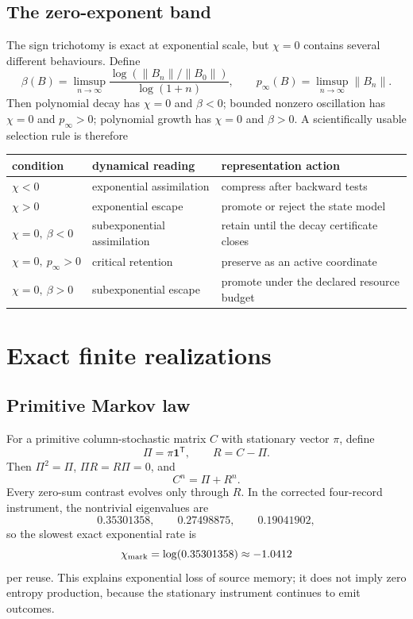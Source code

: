 \documentclass[11pt,a4paper]{article}
\begin{document}
\subsection{The zero-exponent band}
The sign trichotomy is exact at exponential scale, but $\chi=0$ contains several different behaviours. Define
\begin{equation}
\beta(B)=\limsup_{n\to\infty}
\frac{\log(\|B_n\|/\|B_0\|)}{\log(1+n)},
\qquad
p_\infty(B)=\limsup_{n\to\infty}\|B_n\|.
\end{equation}
Then polynomial decay has $\chi=0$ and $\beta<0$; bounded nonzero oscillation has $\chi=0$ and $p_\infty>0$; polynomial growth has $\chi=0$ and $\beta>0$. A scientifically usable selection rule is therefore
\begin{center}
\begin{tabular}{lll}
\toprule
condition&dynamical reading&representation action\\\midrule
$\chi<0$&exponential assimilation&compress after backward tests\\
$\chi>0$&exponential escape&promote or reject the state model\\
$\chi=0,\ \beta<0$&subexponential assimilation&retain until the decay certificate closes\\
$\chi=0,\ p_\infty>0$&critical retention&preserve as an active coordinate\\
$\chi=0,\ \beta>0$&subexponential escape&promote under the declared resource budget\\
\bottomrule
\end{tabular}
\end{center}

\section{Exact finite realizations}
\subsection{Primitive Markov law}
For a primitive column-stochastic matrix $C$ with stationary vector $\pi$, define
\begin{equation}
\Pi=\pi\mathbf1^{\mathsf T},\qquad R=C-\Pi.
\end{equation}
Then $\Pi^2=\Pi$, $\Pi R=R\Pi=0$, and
\begin{equation}
C^n=\Pi+R^n.
\end{equation}
Every zero-sum contrast evolves only through $R$. In the corrected four-record instrument, the nontrivial eigenvalues are
\begin{equation}
0.35301358,\qquad0.27498875,\qquad0.19041902,
\end{equation}
so the slowest exact exponential rate is
\begin{equation}
\chi_{\rm mark}=\log(0.35301358)\approx-1.0412
\end{equation}
per reuse. This explains exponential loss of source memory; it does not imply zero entropy production, because the stationary instrument continues to emit outcomes.
\end{document}
